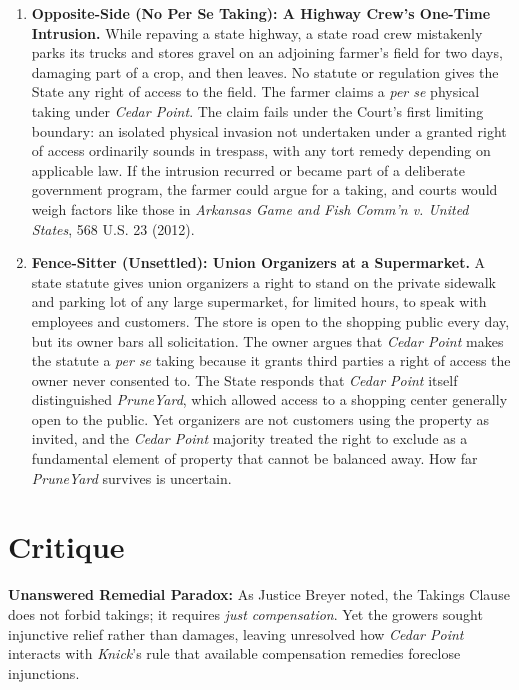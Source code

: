 \documentclass[12pt]{article}
\begin{document}
\begin{enumerate}
\item \textbf{Opposite-Side (No Per Se Taking): A Highway Crew's One-Time Intrusion.} While repaving a state highway, a state road crew mistakenly parks its trucks and stores gravel on an adjoining farmer's field for two days, damaging part of a crop, and then leaves. No statute or regulation gives the State any right of access to the field. The farmer claims a \emph{per se} physical taking under \textit{Cedar Point}. The claim fails under the Court's first limiting boundary: an isolated physical invasion not undertaken under a granted right of access ordinarily sounds in trespass, with any tort remedy depending on applicable law. If the intrusion recurred or became part of a deliberate government program, the farmer could argue for a taking, and courts would weigh factors like those in \textit{Arkansas Game and Fish Comm'n v. United States}, 568 U.S. 23 (2012).

\item \textbf{Fence-Sitter (Unsettled): Union Organizers at a Supermarket.} A state statute gives union organizers a right to stand on the private sidewalk and parking lot of any large supermarket, for limited hours, to speak with employees and customers. The store is open to the shopping public every day, but its owner bars all solicitation. The owner argues that \textit{Cedar Point} makes the statute a \emph{per se} taking because it grants third parties a right of access the owner never consented to. The State responds that \textit{Cedar Point} itself distinguished \textit{PruneYard}, which allowed access to a shopping center generally open to the public. Yet organizers are not customers using the property as invited, and the \textit{Cedar Point} majority treated the right to exclude as a fundamental element of property that cannot be balanced away. How far \textit{PruneYard} survives is uncertain.

\end{enumerate}

\section{Critique}
\textbf{Unanswered Remedial Paradox:} As Justice Breyer noted, the Takings Clause does not forbid takings; it requires \emph{just compensation}. Yet the growers sought injunctive relief rather than damages, leaving unresolved how \textit{Cedar Point} interacts with \textit{Knick}'s rule that available compensation remedies foreclose injunctions.
\end{document}
